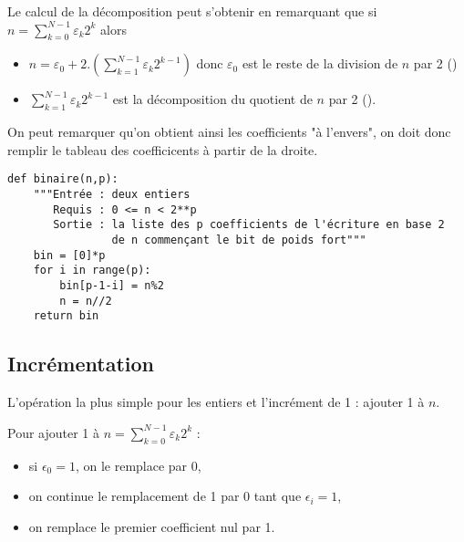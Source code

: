 \medskip

Le calcul de la décomposition peut s'obtenir en remarquant que si $\displaystyle n = \sum_{k=0}^{N-1}\varepsilon_k 2^k$ alors 

\begin{itemize}
    \item $\displaystyle n = \varepsilon_0 + 2.\left(\sum_{k=1}^{N-1}\varepsilon_k2^{k-1}\right)$ donc $\varepsilon_0$ est le reste de la division de $n$ par 2 ()
    \item $\displaystyle\sum_{k=1}^{N-1}\varepsilon_k2^{k-1}$ est la décomposition du quotient de $n$ par 2 (). 
\end{itemize}

On peut remarquer qu'on obtient ainsi les coefficients "à l'envers", on doit donc remplir le tableau des coefficicents à partir de la droite.
\begin{lstlisting}
def binaire(n,p):
    """Entrée : deux entiers
       Requis : 0 <= n < 2**p
       Sortie : la liste des p coefficients de l'écriture en base 2 
                de n commençant le bit de poids fort"""
    bin = [0]*p
    for i in range(p):
        bin[p-1-i] = n%2  
        n = n//2
    return bin
\end{lstlisting}
\subsection{Incrémentation}
L'opération la plus simple pour les entiers et l'incrément de 1 : ajouter 1 à $n$.

Pour ajouter 1 à $\displaystyle n = \sum_{k=0}^{N-1}\varepsilon_k 2^k$ :

\begin{itemize}
    \item si $\epsilon_0=1$, on le remplace par 0,
    \item on continue le remplacement de 1 par 0 tant que $\epsilon_i=1$,
    \item on remplace le premier coefficient nul par 1.
\end{itemize}

